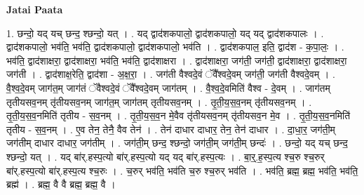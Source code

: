 \documentclass[17pt]{extarticle}
\begin{document}
\textbf{Jatai Paata} \newline

1. छन्दो॒ यद् यच् छन्द॒ श्छन्दो॒ यत् । . यद् द्वाद॑शकपालो॒ द्वाद॑शकपालो॒ यद् यद् द्वाद॑शकपालः । . द्वाद॑शकपालो॒ भव॑ति॒ भव॑ति॒ द्वाद॑शकपालो॒ द्वाद॑शकपालो॒ भव॑ति । . द्वाद॑शकपाल॒ इति॒ द्वाद॑श - क॒पा॒लः॒ । . भव॑ति॒ द्वाद॑शाक्षरा॒ द्वाद॑शाक्षरा॒ भव॑ति॒ भव॑ति॒ द्वाद॑शाक्षरा । . द्वाद॑शाक्षरा॒ जग॑ती॒ जग॑ती॒ द्वाद॑शाक्षरा॒ द्वाद॑शाक्षरा॒ जग॑ती । . द्वाद॑शाक्ष॒रेति॒ द्वाद॑शा - अ॒क्ष॒रा॒ । . जग॑ती वैश्वदे॒वं ॅवै᳚श्वदे॒वम् जग॑ती॒ जग॑ती वैश्वदे॒वम् । . वै॒श्व॒दे॒वम् जाग॑त॒म् जाग॑तं ॅवैश्वदे॒वं ॅवै᳚श्वदे॒वम् जाग॑तम् । . वै॒श्व॒दे॒वमिति॑ वैश्व - दे॒वम् । . जाग॑तम् तृतीयसव॒नम् तृ॑तीयसव॒नम् जाग॑त॒म् जाग॑तम् तृतीयसव॒नम् । . तृ॒ती॒य॒स॒व॒नम् तृ॑तीयसव॒नम् । . तृ॒ती॒य॒स॒व॒नमिति॑ तृतीय - स॒व॒नम् । . तृ॒ती॒य॒स॒व॒न मे॒वैव तृ॑तीयसव॒नम् तृ॑तीयसव॒न मे॒व । . तृ॒ती॒य॒स॒व॒नमिति॑ तृतीय - स॒व॒नम् । . ए॒व तेन॒ तेनै॒ वैव तेन॑ । . तेन॑ दाधार दाधार॒ तेन॒ तेन॑ दाधार । . दा॒धा॒र॒ जग॑ती॒म् जग॑तीम् दाधार दाधार॒ जग॑तीम् । . जग॑ती॒म् छन्द॒ श्छन्दो॒ जग॑ती॒म् जग॑ती॒म् छन्दः॑ । . छन्दो॒ यद् यच् छन्द॒ श्छन्दो॒ यत् । . यद् बा॑र्.हस्प॒त्यो बा॑र्.हस्प॒त्यो यद् यद् बा॑र्.हस्प॒त्यः । . बा॒र्॒.ह॒स्प॒त्य श्च॒रु श्च॒रुर् बा॑र्.हस्प॒त्यो बा॑र्.हस्प॒त्य श्च॒रुः । . च॒रुर् भव॑ति॒ भव॑ति च॒रु श्च॒रुर् भव॑ति । . भव॑ति॒ ब्रह्म॒ ब्रह्म॒ भव॑ति॒ भव॑ति॒ ब्रह्म॑ । . ब्रह्म॒ वै वै ब्रह्म॒ ब्रह्म॒ वै । \newline
\end{document}
